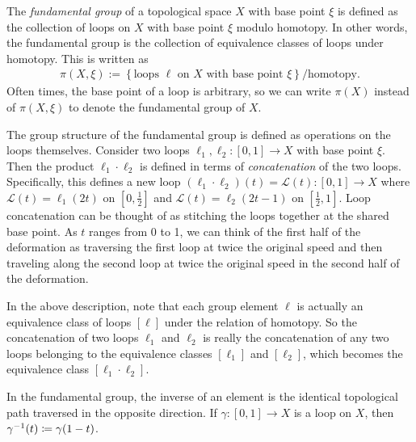 \begin{definition}
    The \textit{fundamental group} of a topological space $X$ with base point $\xi$ is defined as the collection of loops on $X$ with base point $\xi$ modulo homotopy. In other words, the fundamental group is the collection of equivalence classes of loops under homotopy. This is written as
    \begin{align*}
        \pi(X,\xi):=\left\{ \textrm{loops }\ell \textrm{ on }X \textrm{ with base point }\xi \right\}/\textrm{homotopy}.
    \end{align*}
    Often times, the base point of a loop is arbitrary, so we can write $\pi(X)$ instead of $\pi(X,\xi)$ to denote the fundamental group of $X$.
\end{definition}

The group structure of the fundamental group is defined as operations on the loops themselves. Consider two loops $\ell_1,\ell_2:[0,1]\to X$ with base point $\xi$. Then the product $\ell_1\cdot\ell_2$ is defined in terms of \textit{concatenation} of the two loops. Specifically, this defines a new loop $(\ell_1\cdot\ell_2)(t)=\mathcal{L}(t):[0,1]\to X$ where $\mathcal{L}(t) = \ell_1(2t)$ on $\left[ 0,\frac{1}{2} \right]$ and $\mathcal{L}(t) = \ell_2(2t-1)$ on $\left[ \frac{1}{2},1 \right]$. Loop concatenation can be thought of as stitching the loops together at the shared base point. As $t$ ranges from 0 to 1, we can think of the first half of the deformation as traversing the first loop at twice the original speed and then traveling along the second loop at twice the original speed in the second half of the deformation.

In the above description, note that each group element $\ell$ is actually an equivalence class of loops $\left[ \ell \right]$ under the relation of homotopy. So the concatenation of two loops $\ell_1$ and $\ell_2$ is really the concatenation of any two loops belonging to the equivalence classes $\left[ \ell_1 \right]$ and $\left[ \ell_2 \right]$, which becomes the equivalence class $\left[ \ell_1\cdot\ell_2 \right]$.

In the fundamental group, the inverse of an element is the identical topological path traversed in the opposite direction. If $\gamma:[0,1]\to X$ is a loop on $X$, then ${ \gamma }^{-1}(t) \coloneq \gamma(1-t)$.


